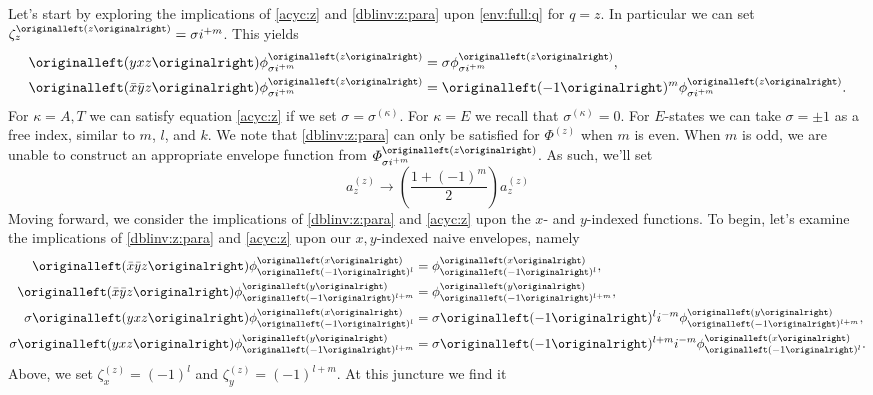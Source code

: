 Let's start by exploring the implications of \eqref{acyc:z} and
\eqref{dblinv:z:para} upon \eqref{env:full:q} for $q = z$. In particular we can
set $\zeta_{z}^{\left(z\right)} = \sigma \im^{+m}$. This yields
\begin{align}
  \left(yxz\right)
  \phi_{ \sigma\im^{+m} }^{\left(z\right)}
  & =
    \sigma
    \phi_{ \sigma\im^{+m} }^{\left(z\right)}
,\\
  \left(\bar{x}\bar{y}z\right)
  \phi_{ \sigma\im^{+m} }^{\left(z\right)}
  & =
    \left(-1\right)^{m}
    \phi_{ \sigma\im^{+m} }^{ \left(z\right) }
.
\end{align}
For $\kappa = A,T$ we can satisfy equation \eqref{acyc:z} if we set $\sigma =
\sigma^{\left(\kappa\right)}$. For $\kappa = E$ we recall that
$\sigma^{\left(\kappa\right)} = 0$. For $E$-states we can take $\sigma = \pm 1$
as a free index, similar to $m$, $l$, and $k$. We note that
\eqref{dblinv:z:para} can only be satisfied for $\Phi^{\left(z\right)}$ when $m$
is even. When $m$ is odd, we are unable to construct an appropriate envelope
function from $\Phi_{ \sigma\im^{+m} }^{\left(z\right)}$. As such, we'll set
\begin{equation}
  a_{z}^{\left(z\right)}
    \rightarrow
  \left(\frac{1+\left(-1\right)^{m}}{2}\right)a_{z}^{\left(z\right)}
\label{state:z-a:z-constraint}
\end{equation}
Moving forward, we consider the implications of \eqref{dblinv:z:para} and
\eqref{acyc:z} upon the $x$- and $y$-indexed functions. To begin, let's examine
the implications of \eqref{dblinv:z:para} and \eqref{acyc:z} upon our
$x,y$-indexed naive envelopes, namely
\begin{align}
  \left(\bar{x}\bar{y}z\right)
  \phi_{ \left(-1\right)^{l} }^{\left(x\right)}
  & =
    \phi_{ \left(-1\right)^{l} }^{\left(x\right)}
,\\
  \left(\bar{x}\bar{y}z\right)
  \phi_{ \left(-1\right)^{l+m} }^{\left(y\right)}
  & =
    \phi_{ \left(-1\right)^{l+m} }^{\left(y\right)}
,\\
  \sigma\left(yxz\right)
  \phi_{ \left(-1\right)^{l} }^{\left(x\right)}
  & =
    \sigma\left(-1\right)^{l}\im^{-m}
    \phi_{ \left(-1\right)^{l+m} }^{\left(y\right)}
  ,\\
  \sigma\left(yxz\right)
  \phi_{ \left(-1\right)^{l+m} }^{\left(y\right)}
  & =
    \sigma\left(-1\right)^{l+m}\im^{-m}
    \phi_{ \left(-1\right)^{l} }^{\left(x\right)}
.
\end{align}
Above, we set $\zeta_{x}^{\left(z\right)}= \left(-1\right)^{l}$ and
$\zeta_{y}^{\left(z\right)}= \left(-1\right)^{l+m}$. At this juncture we find it

